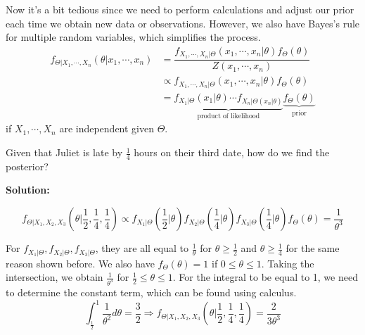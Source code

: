 Now it's a bit tedious since we need to perform calculations and adjust our prior each time we obtain new data or observations. However, we also have Bayes's rule for multiple random variables, which simplifies the process. 
\[
  \begin{aligned}
    f_{\Theta \vert X_1, \cdots, X_n} (\theta \vert x_1, \cdots, x_n) &= \dfrac{f_{X_1, \cdots, X_n \vert \Theta} (x_1, \cdots, x_n \vert \theta) f_{\Theta} (\theta)}{Z(x_1, \cdots, x_n)} \\
    &\propto f_{X_1, \cdots, X_n \vert \Theta} (x_1, \cdots, x_n \vert \theta) f_{\Theta} (\theta) \\ 
    &= \underbrace{f_{X_1 \vert \Theta} (x_1 \vert \theta) \cdots f_{X_n  \vert \Theta(x_n \vert \theta)}}_{\text{product of likelihood}} \underbrace{f_{\Theta} (\theta)}_{\text{prior}}
  \end{aligned}
\]
if \(X_1, \cdots, X_n\) are independent given \(\Theta\).  

\begin{eg}[Cont'd]
  Given that Juliet is late by \(\frac{1}{4}\) hours on their third date, how do we find the posterior? 

  \textbf{Solution:} 

  \[
    f_{\Theta \vert X_1, X_2, X_3} \left(\theta \Big| \dfrac{1}{2}, \dfrac{1}{4}, \dfrac{1}{4}\right) \propto f_{X_1 \vert \Theta} \left(\dfrac{1}{2} \Big| \theta\right) f_{X_2 \vert \Theta} \left(\dfrac{1}{4} \Big| \theta\right) f_{X_3 \vert \Theta} \left(\dfrac{1}{4} \Big| \theta\right) f_{\Theta} (\theta) = \dfrac{1}{\theta^3}
  \]

  For \(f_{X_1 \vert \Theta}, f_{X_2 \vert \Theta}, f_{X_3 \vert \Theta}\), they are all equal to \(\frac{1}{\theta}\) for \(\theta \geq \frac{1}{2}\) and \(\theta \geq \frac{1}{4}\) for the same reason shown before. We also have \(f_{\Theta} (\theta) = 1\) if \(0 \leq \theta \leq 1\). Taking the intersection, we obtain \(\frac{1}{\theta^3}\) for \(\frac{1}{2} \leq \theta \leq 1\). For the integral to be equal to 1, we need to determine the constant term, which can be found using calculus.
  \[
    \int_\frac{1}{2} ^1 \dfrac{1}{\theta^2} d \theta = \dfrac{3}{2} \Longrightarrow f_{\Theta \vert X_1, X_2, X_3} \left(\theta \Big| \dfrac{1}{2}, \dfrac{1}{4}, \dfrac{1}{4}\right) = \dfrac{2}{3\theta^3}
  \]  
\end{eg}

